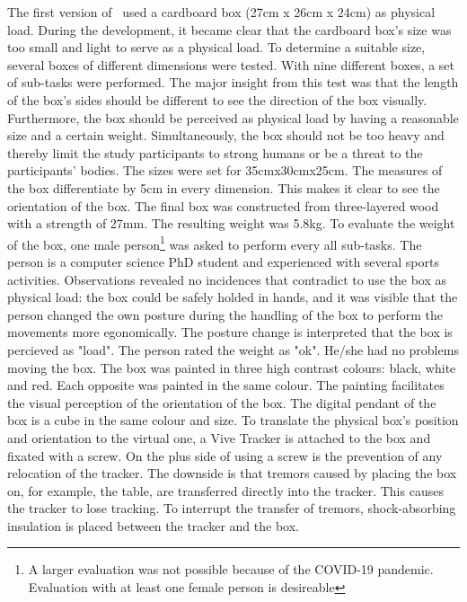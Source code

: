 The first version of \exgo\ used a cardboard box (27cm x 26cm x 24cm) as physical load. During the development, it became clear that the cardboard box's size was too small and light to serve as a physical load. To determine a suitable size, several boxes of different dimensions were tested. With nine different boxes, a set of sub-tasks were performed. The major insight from this test was that the length of the box's sides should be different to see the direction of the box visually. Furthermore, the box should be perceived as physical load by having a reasonable size and a certain weight. Simultaneously, the box should not be too heavy and thereby limit the study participants to strong humans or be a threat to the participants' bodies. The sizes were set for 35cmx30cmx25cm. The measures of the box differentiate by 5cm in every dimension. This makes it clear to see the orientation of the box. The final box was constructed from three-layered wood with a strength of 27mm. The resulting weight was 5.8kg. To evaluate the weight of the box, one male person\footnote{A larger evaluation was not possible because of the COVID-19 pandemic. Evaluation with at least one female person is desireable} was asked to perform every all sub-tasks. The person is a computer science PhD student and experienced with several sports activities. Observations revealed no incidences that contradict to use the box as physical load: the box could be safely holded in hands, and it was visible that the person changed the own posture during the handling of the box to perform the movements more egonomically. The posture change is interpreted that the box is percieved as "load". The person rated the weight as "ok". He/she had no problems moving the box. The box was painted in three high contrast colours: black, white and red. Each opposite was painted in the same colour. The painting facilitates the visual perception of the orientation of the box. The digital pendant of the box is a cube in the same colour and size. To translate the physical box's position and orientation to the virtual one, a Vive Tracker is attached to the box and fixated with a screw. On the plus side of using a screw is the prevention of any relocation of the tracker. The downside is that tremors caused by placing the box on, for example, the table, are transferred directly into the tracker. This causes the tracker to lose tracking. To interrupt the transfer of tremors, shock-absorbing insulation is placed between the tracker and the box.\\
